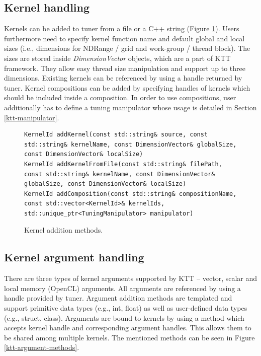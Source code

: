 \documentclass
[
    digital, %
    oneside, %
    table, %
    nolof, %
    nolot, %
    nocover %
]{fithesis3}
\begin{document}
\subsection{Kernel handling}
Kernels can be added to tuner from a file or a C++ string (Figure \ref{ktt-kernel-methods}). Users furthermore need to specify kernel function name and
default global and local sizes (i.e., dimensions for NDRange / grid and work-group / thread block). The sizes are stored inside \textit{DimensionVector}
objects, which are a part of KTT framework. They allow easy thread size manipulation and support up to three dimensions. Existing kernels can be referenced
by using a handle returned by tuner. Kernel compositions can be added by specifying handles of kernels which should be included inside a composition. In order
to use compositions, user additionally has to define a tuning manipulator whose usage is detailed in Section \ref{ktt-manipulator}.

\begin{figure}
\begin{adjustwidth}{-1cm}{-1cm}
\begin{lstlisting}
KernelId addKernel(const std::string& source, const std::string& kernelName, const DimensionVector& globalSize, const DimensionVector& localSize)
KernelId addKernelFromFile(const std::string& filePath, const std::string& kernelName, const DimensionVector& globalSize, const DimensionVector& localSize)
KernelId addComposition(const std::string& compositionName, const std::vector<KernelId>& kernelIds, std::unique_ptr<TuningManipulator> manipulator)
\end{lstlisting}
\caption{Kernel addition methods.}
\label{ktt-kernel-methods}
\end{adjustwidth}
\end{figure}

\subsection{Kernel argument handling}
\label{ktt-argument-handling}
There are three types of kernel arguments supported by KTT -- vector, scalar and local memory (OpenCL) arguments. All arguments are referenced by using
a handle provided by tuner. Argument addition methods are templated and support primitive data types (e.g., int, float) as well as user-defined data
types (e.g., struct, class). Arguments are bound to kernels by using a method which accepts kernel handle and corresponding argument handles. This allows
them to be shared among multiple kernels. The mentioned methods can be seen in Figure \ref{ktt-argument-methods}.
\end{document}
